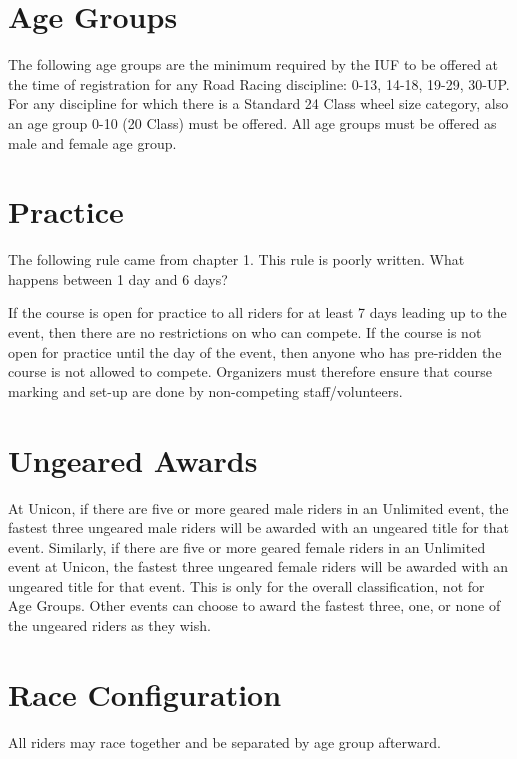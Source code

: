 \section{Age Groups}

The following age groups are the minimum required by the IUF to be offered at the time of registration for any Road Racing discipline: 0-13, 14-18, 19-29, 30-UP.
For any discipline for which there is a Standard 24 Class wheel size category, also an age group 0-10 (20 Class) must be offered.
All age groups must be offered as male and female age group.

\section{Practice}

\begin{comment2016}
The following rule came from chapter 1.
This rule is poorly written.
What happens between 1 day and 6 days?
\end{comment2016}

If the course is open for practice to all riders for at least 7 days leading up to the event, then there are no restrictions on who can compete.
If the course is not open for practice until the day of the event, then anyone who has pre-ridden the course is not allowed to compete.
Organizers must therefore ensure that course marking and set-up are done by non-competing staff/volunteers.

\section{Ungeared Awards}
At Unicon, if there are five or more geared male riders in an Unlimited event, the fastest three ungeared male riders will be awarded with an ungeared title for that event. 
Similarly, if there are five or more geared female riders in an Unlimited event at Unicon, the fastest three ungeared female riders will be awarded with an ungeared title for that event.
This is only for the overall classification, not for Age Groups.
Other events can choose to award the fastest three, one, or none of the ungeared riders as they wish.

\section{Race Configuration}

All riders may race together and be separated by age group afterward.

